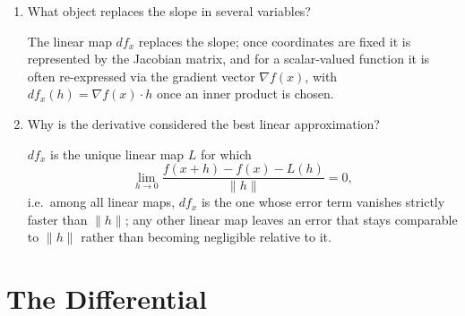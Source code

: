 \documentclass{essay}
\begin{document}
\begin{enumerate}[leftmargin=*, itemsep=8pt]
\item What object replaces the slope in several variables?
\begin{answer}
The linear map \(df_x\) replaces the slope; once coordinates are fixed it is represented by the Jacobian matrix, and for a scalar-valued function it is often re-expressed via the gradient vector \(\nabla f(x)\), with \(df_x(h)=\nabla f(x)\cdot h\) once an inner product is chosen.
\end{answer}

\item Why is the derivative considered the best linear approximation?
\begin{answer}
\(df_x\) is the unique linear map \(L\) for which
\[
\lim_{h\to0}\frac{f(x+h)-f(x)-L(h)}{\|h\|}=0,
\]
i.e.\ among all linear maps, \(df_x\) is the one whose error term vanishes strictly faster than \(\|h\|\); any other linear map leaves an error that stays comparable to \(\|h\|\) rather than becoming negligible relative to it.
\end{answer}

\end{enumerate}

\section{The Differential}
\end{document}
